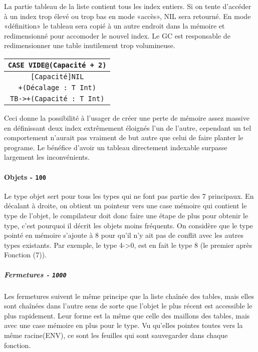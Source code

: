 \documentclass{article}
\begin{document}
La partie tableau de la liste contient tous les index entiers. Si on tente d'accéder à un index trop élevé ou trop bas en mode «accès», NIL sera retourné. En mode «définition» le tableau sera copié à un autre endroit dans la mémoire et redimensionné pour accomoder le nouvel index. Le GC est responsable de redimensionner une table inutilement trop volumineuse.
\begin{center}
\begin{tabular}{|c|}
    \hline
    \texttt{CASE VIDE@(Capacité + 2)}\\
    \hline
    \texttt{[Capacité]NIL}\\
    \hline
    \texttt{+(Décalage : T Int)}\\
    \hline
    \texttt{TB->+(Capacité : T Int)}\\
    \hline
\end{tabular}
\end{center}
Ceci donne la possibilité à l'usager de créer une perte de mémoire assez massive en définissant deux index extrêmement éloignés l'un de l'autre, cependant un tel comportement n'aurait pas vraiment de but autre que celui de faire planter le programe. Le bénéfice d'avoir un tableau directement indexable surpasse largement les inconvénients.

\paragraph{Objets - \texttt{100}}
Le type objet sert pour tous les types qui ne font pas partie des 7 principaux. En décalant à droite, on obtient un pointeur vers une case mémoire qui contient le type de l'objet, le compilateur doit donc faire une étape de plus pour obtenir le type, c'est pourquoi il décrit les objets moins fréquents. On considère que le type pointé en mémoire s'ajoute à 8 pour qu'il n'y ait pas de conflit avec les autres types existants. Par exemple, le type 4->0, est en fait le type 8 (le premier après Fonction (7)).
\setcounter{subparagraph}{-1}
\subparagraph{Fermetures - \texttt{1000}}
Les fermetures suivent le même principe que la liste chaînée des tables, mais elles sont chaînées dans l'autre sens de sorte que l'objet le plus récent est accessible le plus rapidement. Leur forme est la même que celle des maillons des tables, mais avec une case mémoire en plus pour le type. Vu qu'elles pointes toutes vers la même racine(ENV), ce sont les feuilles qui sont sauvegarder dans chaque fonction.
\end{document}
